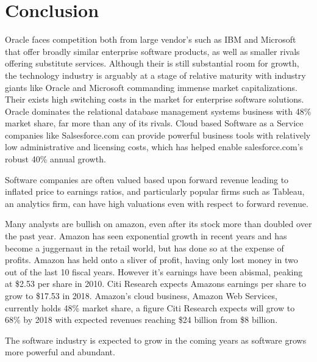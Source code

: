 \section*{Conclusion}

Oracle faces competition both from large vendor's such as IBM and Microsoft that offer broadly similar enterprise software products, as well as smaller rivals offering substitute services.\autocite[]{finkle2012larry}
Although their is still substantial room for growth, the technology industry is arguably at a stage of relative maturity with industry giants like Oracle and Microsoft commanding immense market capitalizations.\autocite[]{finkle2012larry}
Their exists high switching costs in the market for enterprise software solutions.\autocite[]{finkle2012larry}
Oracle dominates the relational database management systems business with 48\% market share, far more than any of its rivals.\autocite[]{finkle2012larry}
Cloud based Software as a Service companies like Salsesforce.com can provide powerful business tools with relatively low administrative and licensing costs, which has helped enable salesforce.com's robust 40\% annual growth.\autocite[]{HorizontalPlaysTechnology}

Software companies are often valued based upon forward revenue leading to inflated price to earnings ratios, and particularly popular firms such as Tableau, an analytics firm, can have high valuations even with respect to forward revenue.\autocite[]{HorizontalPlaysTechnology}

Many analysts are bullish on amazon, even after its stock more than doubled over the past year.\autocite[]{AmazonDouble}
Amazon has seen exponential growth in recent years and has become a juggernaut in the retail world, but has done so at the expense of profits.\autocite[]{AmazonProfit}
Amazon has held onto a sliver of profit, having only lost money in two out of the last 10 fiscal years. However it's earnings have been abismal, peaking at \$2.53 per share in 2010.\autocite[]{AmazonProfit}
Citi Research expects Amazons earnings per share to grow to \$17.53 in 2018.\autocite[]{AmazonProfit}
Amazon's cloud business, Amazon Web Services, currently holds 48\% market share, a figure Citi Research expects will grow to 68\% by 2018 with expected revenues reaching \$24 billion from \$8 billion.\autocite[]{AmazonProfit}

The software industry is expected to grow in the coming years as software grows more powerful and abundant.\autocite[21]{SurveysSoftware2015}

